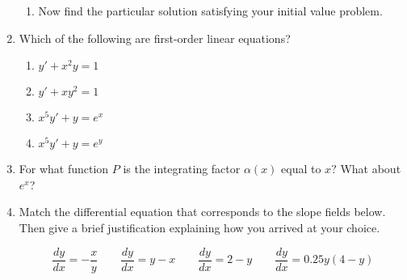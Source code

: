 \documentclass{nosvagor-notes}
\newcommand*{\TickSize}{2pt}%
\begin{document}
\begin{enumerate}
\begin{enumerate}
      \item Now find the particular solution satisfying your initial value problem.
        \vspace{140pt}
    \end{enumerate}

  \item Which of the following are first-order linear equations?
    \begin{multicols}{2}
    \begin{enumerate}
      \item \(y' + x^2y = 1\)
      \item \(y' + xy^2 = 1\)
      \item \(x^5y' + y = e^x\)
      \item \(x^5y' + y = e^y\)
    \end{enumerate}
    \end{multicols}
    \vspace{80pt}

  \item For what function \(P\) is the integrating factor \(\alpha (x) \) equal
    to \(x?\) What about \(e^x\)?
  \newpage

\item Match the differential equation that corresponds to the slope fields
  below. Then give a brief justification explaining how you arrived at your
  choice.

  \[%
  \frac{dy}{dx} = -\frac{x}{y} \qquad \frac{dy}{dx} = y - x \qquad
  \frac{dy}{dx} = 2 - y \qquad \frac{dy}{dx} = 0.25y(4-y)
  \]%

\end{enumerate}
\end{document}

